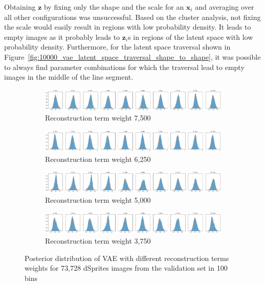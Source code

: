 Obtaining $\bm{z}$ by fixing only the shape and the scale for an $\bm{x}_i$ and averaging over all other configurations was unsuccessful.
Based on the cluster analysis, not fixing the scale would easily result in regions with low probability density.
It leads to empty images as it probably leads to $\bm{z}_i$s in regions of the latent space with low probability density.
Furthermore, for the latent space traversal shown in Figure~\ref{fig:10000_vae_latent_space_traversal_shape_to_shape}, it was possible to always find parameter combinations for which the traversal lead to empty images in the middle of the line segment.

\begin{figure}
    \centering
    \begin{subfigure}{\textwidth}
        \centering
        \includegraphics[width=\textwidth]{images/latent_space_entanglement/vae_dsprites_lf_7500_dist.png}
        \caption{Reconstruction term weight 7,500}
    \end{subfigure}
    \begin{subfigure}{\textwidth}
        \centering
        \includegraphics[width=\textwidth]{images/latent_space_entanglement/vae_dsprites_lf_6250_dist.png}
        \caption{Reconstruction term weight 6,250}
    \end{subfigure}
    \begin{subfigure}{\textwidth}
        \centering
        \includegraphics[width=\textwidth]{images/latent_space_entanglement/vae_dsprites_lf_5000_dist.png}
        \caption{Reconstruction term weight 5,000}
    \end{subfigure}
    \begin{subfigure}{\textwidth}
        \centering
        \includegraphics[width=\textwidth]{images/latent_space_entanglement/vae_dsprites_lf_3750_dist.png}
        \caption{Reconstruction term weight 3,750}
    \end{subfigure}
    \caption[VAE Latent Space Distribution - Different Reconstruction Term Weights]{Posterior distribution of VAE with different reconstruction terms weights for 73,728 dSprites images from the validation set in 100 bins}
    \label{fig:7500_5000_vae_latent_space_distribution_scales_and_shapes}
\end{figure}

